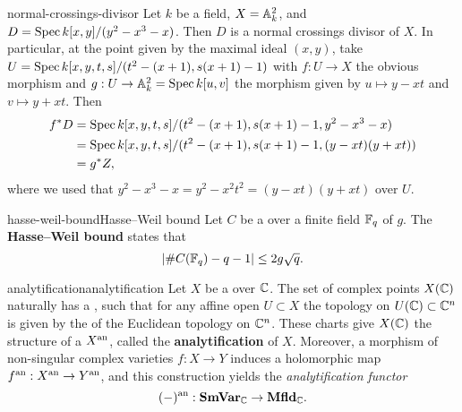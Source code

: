 \begin{example}{normal-crossings-divisor}
    Let $k$ be a field, $X = \AA^2_k$, and $D = \Spec k[x, y] / (y^2 - x^3 - x)$. Then $D$ is a normal crossings divisor of $X$. In particular, at the point given by the maximal ideal $(x, y)$, take $U = \Spec k[x, y, t, s] / (t^2 - (x + 1), s (x + 1) - 1)$ with $f : U \to X$ the obvious morphism and $g : U \to \AA^2_k = \Spec k[u, v]$ the morphism given by $u \mapsto y - xt$ and $v \mapsto y + xt$. Then
    \[ \begin{aligned}
        f^* D
            &= \Spec k[x, y, t, s] / (t^2 - (x + 1), s(x + 1) - 1, y^2 - x^3 - x) \\
            &= \Spec k[x, y, t, s] / (t^2 - (x + 1), s(x + 1) - 1, (y - xt)(y + xt)) \\
            &= g^* Z ,
    \end{aligned} \]
    where we used that $y^2 - x^3 - x = y^2 - x^2 t^2 = (y - xt)(y + xt)$ over $U$.
\end{example}

\begin{topic}{hasse-weil-bound}{Hasse--Weil bound}
    Let $C$ be a    over a finite field $\FF_q$ of  $g$. The \textbf{Hasse--Weil bound} states that
    \[ | \#C(\FF_q) - q - 1 | \le 2 g \sqrt{q} . \]
\end{topic}

\begin{topic}{analytification}{analytification}
    Let $X$ be a   over $\CC$. 
    The set of complex points $X(\CC)$ naturally has a , such that for any affine open $U \subset X$ the topology on $U(\CC) \subset \CC^n$ is given by the  of the Euclidean topology on $\CC^n$. These charts give $X(\CC)$ the structure of a  $X^\textup{an}$, called the \textbf{analytification} of $X$. Moreover, a morphism of non-singular complex varieties $f : X \to Y$ induces a holomorphic map $f^\textup{an} : X^\textup{an} \to Y^\textup{an}$, and this construction yields the \textit{analytification functor}
    \[ (-)^\textup{an} : \textbf{SmVar}_\CC \to \textbf{Mfld}_\CC . \]
\end{topic}

